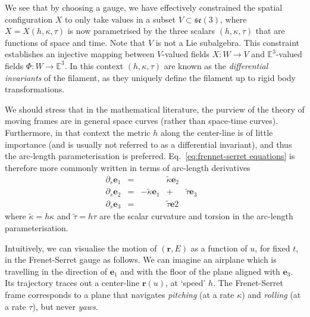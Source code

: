 We see that by choosing a gauge, we have effectively constrained the spatial configuration $X$ to only take values in a subset $V \subset \mathfrak{se}(3)$, where $X = X(h, \kappa, \tau)$ is now parametrised by the three scalars $(h, \kappa, \tau)$ that are functions of space and time. Note that $V$ is not a Lie subalgebra. This constraint establishes an injective mapping between $V$-valued fields $X : W \to V$ and $\mathbb{E}^3$-valued fields $\Phi : W \to \mathbb{E}^3$. In this context $(h, \kappa, \tau)$ are known as the \textit{differential invariants} of the filament, as they uniquely define the filament up to rigid body transformations.

We should stress that in the mathematical literature, the purview of the theory of moving frames are in general space curves (rather than space-time curves). Furthermore, in that context the metric $h$ along the center-line is of little importance (and is usually not referred to as a differential invariant), and thus the arc-length parameterisation is preferred. Eq.~\ref{eq:frennet-serret equations} is therefore more commonly written in terms of arc-length derivatives
\begin{equation} \label{eq:frennet-serret equations arc-length}
\begin{matrix}
\partial_s \mathbf{e}_1 & = & & \tilde{\kappa} \mathbf{e}_2 & \\
\partial_s \mathbf{e}_2 & = & - \tilde{\kappa} \mathbf{e}_1 & + & \tilde{\tau} \mathbf{e}_3 & \\
\partial_s \mathbf{e}_3 & = &  & \tilde{\tau} \mathbf{e}2  &
\end{matrix}
\end{equation}
where $\tilde{\kappa} = h \kappa$ and $\tilde{\tau} = h \tau$ are the scalar curvature and torsion in the arc-length parameterisation.

Intuitively, we can visualise the motion of $(\mathbf{r}, E)$ as a function of $u$, for fixed $t$, in the Frenet-Serret gauge as follows. We can imagine an airplane which is travelling in the direction of $\mathbf{e}_1$ and with the floor of the plane aligned with $\mathbf{e}_3$. Its trajectory traces out a center-line $\mathbf{r}(u)$, at `speed' $h$. The Frenet-Serret frame corresponds to a plane that navigates \textit{pitching} (at a rate $\kappa$) and \textit{rolling} (at a rate $\tau$), but never \textit{yaws}.

